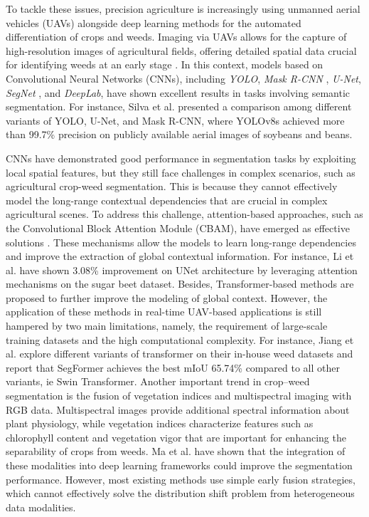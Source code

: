 \documentclass[pdflatex,sn-mathphys-num]{sn-jnl}
\begin{document}
To tackle these issues, precision agriculture is increasingly using unmanned aerial vehicles (UAVs) alongside deep learning methods for the automated differentiation of crops and weeds. Imaging via UAVs allows for the capture of high-resolution images of agricultural fields, offering detailed spatial data crucial for identifying weeds at an early stage \cite{zhao2025deep,saini2025review,pena2013weedmapping,sa2018weednet,bah2018weed,fan2023crossmodal_weed}. In this context, models based on Convolutional Neural Networks (CNNs), including \textit{YOLO}\cite{yaseen2025yolov8}, \textit{Mask R-CNN} \cite{he2017maskrcnn}, \textit{U-Net}\cite{ronneberger2015unet}, \textit{SegNet} \cite{badrinarayanan2017segnet}, and \textit{DeepLab}\cite{chen2017deeplabv3}\cite{chen2018Deeplabv3plus}, have shown excellent results in tasks involving semantic segmentation. For instance, Silva et al. \cite{silva2024deep} presented a comparison among different variants of YOLO, U-Net, and Mask R-CNN, where YOLOv8s achieved more than 99.7\% precision on publicly available aerial images of soybeans and beans.

CNNs have demonstrated good performance in segmentation tasks by exploiting local spatial features, but they still face challenges in complex scenarios, such as agricultural crop-weed segmentation. This is because they cannot effectively model the long-range contextual dependencies that are crucial in complex agricultural scenes. To address this challenge, attention-based approaches, such as the Convolutional Block Attention Module (CBAM), have emerged as effective solutions \cite{woo2018cbam,hu2018senet,oktay2018attentionunet,wang2018nonlocal}. These mechanisms allow the models to learn long-range dependencies and improve the extraction of global contextual information. For instance, Li et al.\cite{li2025improved} have shown 3.08\% improvement on  UNet architecture by leveraging attention mechanisms on the sugar beet dataset. Besides, Transformer-based methods  \cite{dosovitskiy2021vit, xie2021segformer, liu2021swin} are proposed to further improve the modeling of global context. However, the application of these methods in real-time UAV-based applications is still hampered by two main limitations, namely, the requirement of large-scale training datasets and the high computational complexity. For instance, Jiang et al.\cite{jiang2022transformer} explore different variants of transformer on their in-house weed datasets and report that SegFormer achieves the best mIoU 65.74\% compared to all other variants, ie Swin Transformer.
Another important trend in crop–weed segmentation is the fusion of vegetation indices \cite{hunt2013vegetation} and multispectral imaging \cite{zhang2021multispectral} with RGB data. Multispectral images provide additional spectral information about plant physiology, while vegetation indices characterize features such as chlorophyll content and vegetation vigor that are important for enhancing the separability of crops from weeds. Ma et al. \cite{ma2024vegetation_dl} have shown that the integration of these modalities into deep learning frameworks could improve the segmentation performance. However, most existing methods use simple early fusion strategies, which cannot effectively solve the distribution shift problem from heterogeneous data modalities. 
\end{document}
